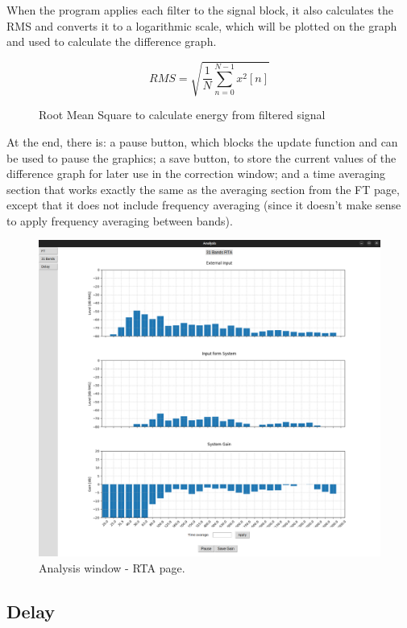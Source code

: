 When the program applies each filter to the signal block, it also calculates the RMS and converts it to a logarithmic scale, which will be plotted on the graph and used to calculate the difference graph.

\begin{figure}[H]
	\centering
	\caption{Root Mean Square to calculate energy from filtered signal}
	\[
	RMS = \sqrt{ \frac{1}{N} \sum_{n=0}^{N-1} x^2[n] }
	\]
\end{figure}

At the end, there is: a pause button, which blocks the update function and can be used to pause the graphics; a save button, to store the current values of the difference graph for later use in the correction window; and a time averaging section that works exactly the same as the averaging section from the FT page, except that it does not include frequency averaging (since it doesn't make sense to apply frequency averaging between bands).

\begin{figure}[H]
	\centering
	\includegraphics[width=1
	\linewidth]{Figures/RTA_page.png}
	\caption{Analysis window - RTA page.}
	\label{fig:DBX_31s}
\end{figure}


\subsection{Delay}

